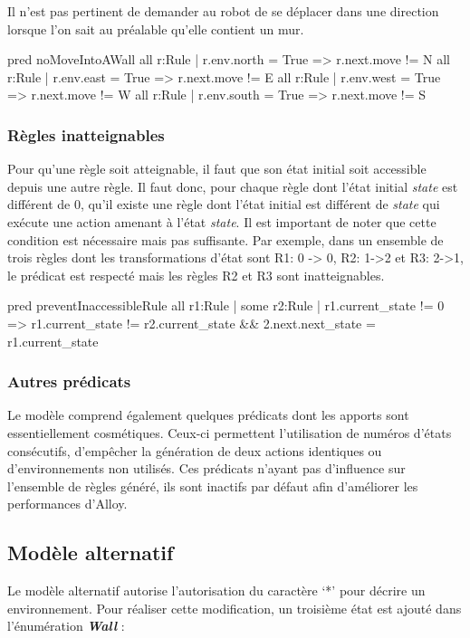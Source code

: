 \documentclass{article}
\begin{document}
Il n'est pas pertinent de demander au robot de se déplacer dans une direction lorsque l'on sait au préalable qu'elle contient un mur. 

\begin{alloy}
pred noMoveIntoAWall {
  all r:Rule | r.env.north = True => r.next.move != N
  all r:Rule | r.env.east = True => r.next.move != E
  all r:Rule | r.env.west = True => r.next.move != W
  all r:Rule | r.env.south = True => r.next.move != S
}
\end{alloy}

\subsubsection*{Règles inatteignables}
Pour qu’une règle soit atteignable, il faut que son état initial soit accessible depuis une autre règle. Il faut donc, pour chaque règle dont l’état initial \textit{state} est différent de 0, qu’il existe une règle dont l’état initial est différent de \textit{state} qui exécute une action amenant à l’état \textit{state}. Il est important de noter que cette condition est nécessaire mais pas suffisante. Par exemple, dans un ensemble de trois règles dont les transformations d’état sont R1: 0 -> 0, R2: 1->2 et R3: 2->1, le prédicat est respecté mais les règles R2 et R3 sont inatteignables.

\begin{alloy}
pred preventInaccessibleRule {
  all r1:Rule | some r2:Rule | r1.current_state != 0 => r1.current_state != r2.current_state && 2.next.next_state = r1.current_state
}
\end{alloy}

\subsubsection{Autres prédicats}
Le modèle comprend également quelques prédicats dont les apports sont essentiellement cosmétiques. Ceux-ci permettent l'utilisation de numéros d’états consécutifs, d'empêcher la génération de deux actions identiques ou d’environnements non utilisés. Ces prédicats n'ayant pas d'influence sur l'ensemble de règles généré, ils sont inactifs par défaut afin d'améliorer les performances d'Alloy.

\subsection{Modèle alternatif}
Le modèle alternatif autorise l'autorisation du caractère ‘*’ pour décrire un environnement. Pour réaliser cette modification, un troisième état est ajouté dans l’énumération \textit{\textbf{Wall}} :
\end{document}
